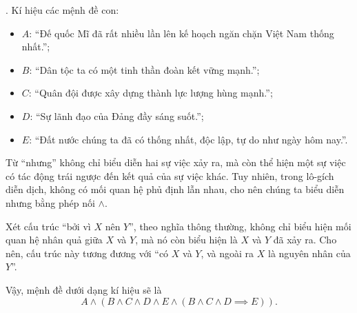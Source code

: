 . Kí hiệu các mệnh đề con:
\begin{itemize}
    \item $A$: ``Đế quốc Mĩ đã rất nhiều lần lên kế hoạch ngăn chặn Việt Nam thống nhất.'';
    \item $B$: ``Dân tộc ta có một tinh thần đoàn kết vững mạnh.'';
    \item $C$: ``Quân đội được xây dựng thành lực lượng hùng mạnh.'';
    \item $D$: ``Sự lãnh đạo của Đảng đầy sáng suốt.'';
    \item $E$: ``Đất nước chúng ta đã có thống nhất, độc lập, tự do như ngày hôm nay.''.
\end{itemize}

Từ ``nhưng'' không chỉ biểu diễn hai sự việc xảy ra, mà còn thể hiện một sự việc có tác động trái ngược đến kết quả của sự việc khác. Tuy nhiên, trong lô-gích diễn dịch, không có mối quan hệ phủ định lẫn nhau, cho nên chúng ta biểu diễn nhưng bằng phép nối $\land$.

Xét cấu trúc ``bởi vì $X$ nên $Y$'', theo nghĩa thông thường, không chỉ biểu hiện mối quan hệ nhân quả giữa $X$ và $Y$, mà nó còn biểu hiện là $X$ và $Y$ đã xảy ra. Cho nên, cấu trúc này tương đương với ``có $X$ và $Y$, và ngoài ra $X$ là nguyên nhân của $Y$''.

Vậy, mệnh đề dưới dạng kí hiệu sẽ là
$$A \land (B \land C \land D \land E \land (B \land C \land D \implies E)).$$
